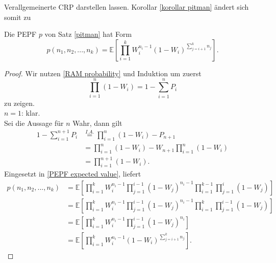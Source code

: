 \begin{section}{Verallgemeinerte CRP}
darstellen lassen. Korollar \ref{korollar pitman} ändert sich somit zu
\begin{Korollar}
    \label{second korollar Pitman}
    Die PEPF $p$ von Satz \ref{pitman} hat Form
    \[
    p(n_1,n_2,...,n_k) = \mathbb{E}\left[\prod_{i=1}^{k}W_i^{n_i-1}(1-W_i)^{\sum_{j=i+1}^{k}n_j}\right].
    \]
\end{Korollar}
\begin{proof}
   Wir nutzen \ref{RAM probability} und Induktion um zuerst
   \[
    \prod_{i=1}^{n}(1-W_i) = 1 - \sum_{i=1}^{n}P_i
   \] 
   zu zeigen.\\
   $n = 1$: klar. \\
   Sei die Aussage für $n$ Wahr, dann gilt 
   \begin{align*}
    1 - \sum_{i=1}^{n+1}P_i &\overset{I.A.}{=} \prod_{i=1}^{n}(1-W_i) - P_{n+1}\\
    &=  \prod_{i=1}^{n}(1-W_i) - W_{n+1}\prod_{i=1}^{n}(1-W_i) \\
    &= \prod_{i=1}^{n+1}(1-W_i).
   \end{align*}
   Eingesetzt in \ref{PEPF expected value}, liefert 
   \begin{align*}
    p(n_1,n_2,...,n_k) &= \mathbb{E}\left[\prod_{i=1}^{k}W_i^{n_i-1}\prod_{j=1}^{i-1}(1-W_j)^{n_i-1}\prod_{i=1}^{k-1}\prod_{j=1}^{i}(1-W_j)\right]\\
    &= \mathbb{E}\left[\prod_{i=1}^{k}W_i^{n_i-1}\prod_{j=1}^{i-1}(1-W_j)^{n_i-1}\prod_{i=1}^{k}\prod_{j=1}^{i-1}(1-W_j)\right]\\
    &= \mathbb{E}\left[\prod_{i=1}^{k}W_i^{n_i-1}\prod_{j=1}^{i-1}(1-W_j)^{n_i}\right]\\
    &=\mathbb{E}\left[\prod_{i=1}^{k}W_i^{n_i-1}(1-W_i)^{\sum_{j=i+1}^{k}n_j}\right].
   \end{align*}  


\end{proof}
\end{section}
